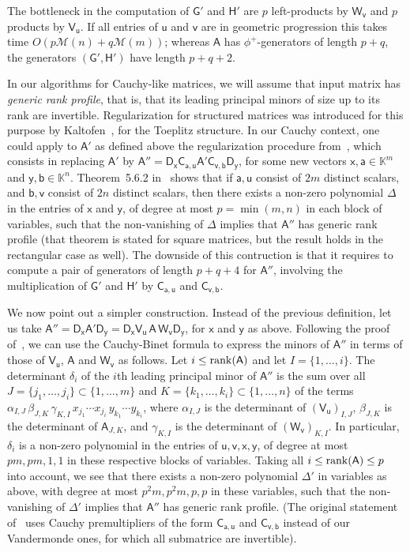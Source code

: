 \documentclass{sig-alternate}
\newcommand{\va}{\ensuremath{\mathsf{a}}}
\newcommand{\vb}{\ensuremath{\mathsf{b}}}
\newcommand{\vu}{\ensuremath{\mathsf{u}}}
\newcommand{\vv}{\ensuremath{\mathsf{v}}}
\newcommand{\vx}{\ensuremath{\mathsf{x}}}
\newcommand{\vy}{\ensuremath{\mathsf{y}}}
\newcommand{\mA}{\ensuremath{\mathsf{A}}}
\newcommand{\mC}{\ensuremath{\mathsf{C}}}
\newcommand{\mD}{\ensuremath{\mathsf{D}}}
\newcommand{\mG}{\ensuremath{\mathsf{G}}}
\newcommand{\mH}{\ensuremath{\mathsf{H}}}
\newcommand{\mV}{\ensuremath{\mathsf{V}}}
\newcommand{\mW}{\ensuremath{\mathsf{W}}}
\newcommand{\K}{\ensuremath{\mathbb{K}}}
\newcommand{\M}{\ensuremath{\mathscr{M}}}
\begin{document}
The bottleneck in the computation of $\mG'$ and $\mH'$ are $p$
left-products by $\mW_\vv$ and $p$ products by $\mV_\vu$.  If all
entries of $\vu$ and $\vv$ are in geometric progression this takes
time $O(p \M(n) + q \M(m))$; whereas $\mA$ has $\phi^+$-generators of
length $p+q$, the generators $(\mG',\mH')$ have length $p+q+2$.

\smallskip{}  In our algorithms for
Cauchy-like matrices, we will assume that input matrix has {\em
  generic rank profile}, that is, that its leading principal minors of
size up to its rank are invertible.  Regularization for structured
matrices was introduced for this purpose by
Kaltofen~\cite{Kaltofen94}, for the Toeplitz structure. In our Cauchy
context, one could apply to $\mA'$ as defined above the regularization
procedure from~\cite[Section~5.6]{Pan01}, which consists in replacing
$\mA'$ by $\mA'' = \mD_\vx \mC_{\va,\vu} \mA' \mC_{\vv,\vb}\mD_\vy$,
for some new vectors $\vx,\va \in \K^m$ and $\vy,\vb \in
\K^n$. Theorem~5.6.2 in~\cite{Pan01} shows that if $\va,\vu$ consist
of $2m$ distinct scalars, and $\vb,\vv$ consist of $2n$ distinct
scalars, then there exists a non-zero polynomial $\Delta$ in the
entries of $\vx$ and $\vy$, of degree at most $p=\min(m,n)$ in each
block of variables, such that the non-vanishing of $\Delta$ implies
that $\mA''$ has generic rank profile (that theorem is stated for
square matrices, but the result holds in the rectangular case as
well).  The downside of this contruction is that it requires to
compute a pair of generators of length $p+q+4$ for $\mA''$, involving
the multiplication of $\mG'$ and $\mH'$ by $\mC_{\va,\vu}$ and
$\mC_{\vv,\vb}$.

We now point out a simpler construction. Instead of the previous
definition, let us take $\mA''= \mD_\vx \mA' \mD_\vy=\mD_\vx \mV_\vu\,
\mA\, \mW_\vv \mD_\vy$, for $\vx$ and $\vy$ as above. Following the
proof of~\cite[Theorem~5.6.2]{Pan01}, we can use the Cauchy-Binet
formula to express the minors of $\mA''$ in terms of those of
$\mV_\vu$, $\mA$ and $\mW_\vv$ as follows. Let $i \le {\rm rank}(\mA)$
and let $I=\{1,\dots,i\}$. The determinant $\delta_i$ of the $i$th
leading principal minor of $\mA''$ is the sum over all
$J=\{j_1,\dots,j_i\} \subset \{1,\dots,m\}$ and $K=\{k_1,\dots,k_i\}
\subset \{1,\dots,n\}$ of the terms $\alpha_{I,J}\, \beta_{J,K}\,
\gamma_{K,I}\, x_{j_1}\cdots x_{j_i}\, y_{k_1}\cdots y_{k_i}$, where
$\alpha_{I,J}$ is the determinant of $(\mV_\vu)_{I,J}$, $\beta_{J,K}$
is the determinant of $\mA_{J,K}$, and $\gamma_{K,I}$ is the
determinant of $(\mW_\vv)_{K,I}$.  In particular, $\delta_i$ is a
non-zero polynomial in the entries of $\vu,\vv,\vx,\vy$, of degree at
most $pm,pm,1,1$ in these respective blocks of variables.  Taking all
$i\le {\rm rank}(\mA)\le p$ into account, we see that there exists a
non-zero polynomial $\Delta'$ in variables as above, with degree at
most $p^2m,p^2m,p,p$ in these variables, such that the non-vanishing
of $\Delta'$ implies that $\mA''$ has generic rank profile.  (The
original statement of~\cite[Theorem~5.6.2]{Pan01} uses Cauchy
premultipliers of the form $\mC_{\va,\vu}$ and $\mC_{\vv,\vb}$ instead
of our Vandermonde ones, for which all submatrice  are invertible).
\end{document}
